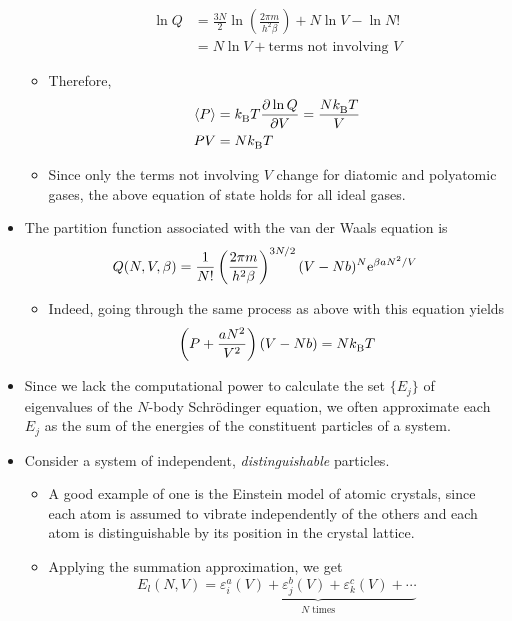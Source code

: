 \documentclass[../notes.tex]{subfiles}
\begin{document}
\begin{itemize}
\begin{itemize}
        \begin{align*}
            \ln Q &= \frac{3N}{2}\ln\left( \frac{2\pi m}{h^2\beta} \right)+N\ln V-\ln N!\\
            &= N\ln V+\text{terms not involving }V
        \end{align*}
        \item Therefore,
        \begin{align*}
            \prb{P} &= \kB T\pdv{\ln Q}{V} = \frac{N\kB T}{V}\\
            PV &= N\kB T
        \end{align*}
        \item Since only the terms not involving $V$ change for diatomic and polyatomic gases, the above equation of state holds for all ideal gases.
    \end{itemize}
    \item The partition function associated with the van der Waals equation is
    \begin{equation*}
        Q(N,V,\beta) = \frac{1}{N!}\left( \frac{2\pi m}{h^2\beta} \right)^{3N/2}(V-Nb)^N\e[\beta aN^2/V]
    \end{equation*}
    \begin{itemize}
        \item Indeed, going through the same process as above with this equation yields
        \begin{equation*}
            \left( P+\frac{aN^2}{V^2} \right)(V-Nb) = N\kB T
        \end{equation*}
    \end{itemize}
    \item Since we lack the computational power to calculate the set $\{E_j\}$ of eigenvalues of the $N$-body Schr\"{o}dinger equation, we often approximate each $E_j$ as the sum of the energies of the constituent particles of a system.
    \item Consider a system of independent, \emph{distinguishable} particles.
    \begin{itemize}
        \item A good example of one is the Einstein model of atomic crystals, since each atom is assumed to vibrate independently of the others and each atom is distinguishable by its position in the crystal lattice.
        \item Applying the summation approximation, we get
        \begin{equation*}
            E_l(N,V) = \underbrace{\varepsilon_i^a(V)+\varepsilon_j^b(V)+\varepsilon_k^c(V)+\cdots}_{N\text{ times}}

\end{equation*}
\end{itemize}
\end{itemize}
\end{document}
